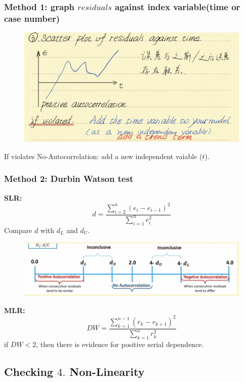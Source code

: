 \documentclass[11pt,a4paper]{article}
\begin{document}
\subsubsection{Method 1: graph $residuals$ against index variable(time or case number)}
\begin{center}\begin{figure}[htbp]
    \centering
    \includegraphics[scale=0.7]{check3.png}
    \caption{}
    \label{}
\end{figure}\end{center}
If violates No-Autocorrelation: add a new independent vaiable ($t$).
\subsubsection{Method 2: Durbin Watson test}
\textbf{SLR:}\\
$$d=\frac{\sum_{i=2}^n(e_i-e_{i-1})^2}{\sum_{i=1}^ne_i^2}$$
Compare $d$ with $d_L$ and $d_U$.
\begin{center}\begin{figure}[htbp]
    \centering
    \includegraphics[scale=0.5]{check4.png}
    \caption{}
    \label{}
\end{figure}\end{center}

\textbf{MLR:}\\
$$DW=\frac{\sum_{k=1}^{n-1}(r_k-r_{k+1})^2}{\sum_{k=1}^nr_k^2}$$
if $DW<2$, then there is evidence for positive serial dependence.

\subsection{ Checking $4.$ Non-Linearity}
\end{document}
